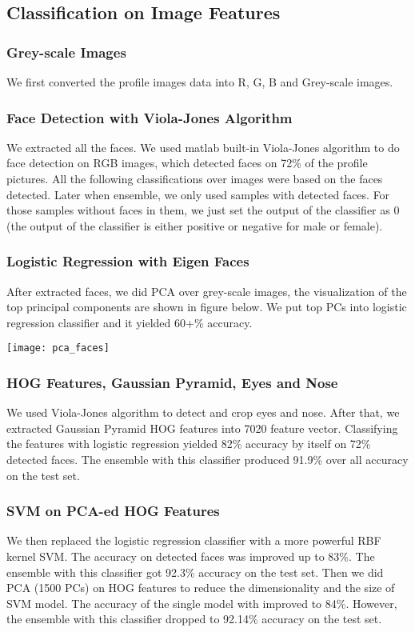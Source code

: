 \subsection{Classification on Image Features}
\subsubsection{Grey-scale Images}
We first converted the profile images data into R, G, B and Grey-scale images. 
\subsubsection{Face Detection with Viola-Jones Algorithm}
We extracted all the faces. We used matlab built-in Viola-Jones algorithm to do face detection on RGB images, which detected faces on 72\% of the profile pictures. All the following classifications over images were based on the faces detected. Later when ensemble, we only used samples with detected faces. For those samples without faces in them, we just set the output of the classifier as 0 (the output of the classifier is either positive or negative for male or female).
\subsubsection{Logistic Regression with Eigen Faces}
After extracted faces, we did PCA over grey-scale images, the visualization of the top principal components are shown in figure below. We put top PCs into logistic regression classifier and it yielded 60+\% accuracy. \\
\begin{center}
\texttt{[image: pca\_faces]}
\end{center}
\subsubsection{HOG Features, Gaussian Pyramid, Eyes and Nose}
We used Viola-Jones algorithm to detect and crop eyes and nose. After that, we extracted Gaussian Pyramid HOG features into 7020 feature vector. Classifying the features with logistic regression yielded 82\% accuracy by itself on 72\% detected faces. The ensemble with this classifier produced 91.9\% over all accuracy on the test set. 
\subsubsection{SVM on PCA-ed HOG Features}
We then replaced the logistic regression classifier with a more powerful RBF kernel SVM. The accuracy on detected faces was improved up to 83\%. The ensemble with this classifier got 92.3\% accuracy on the test set.  Then we did PCA (1500 PCs) on HOG features to reduce the dimensionality and the size of SVM model. The accuracy of the single model with improved to 84\%. However, the ensemble with this classifier dropped to 92.14\% accuracy on the test set. 
